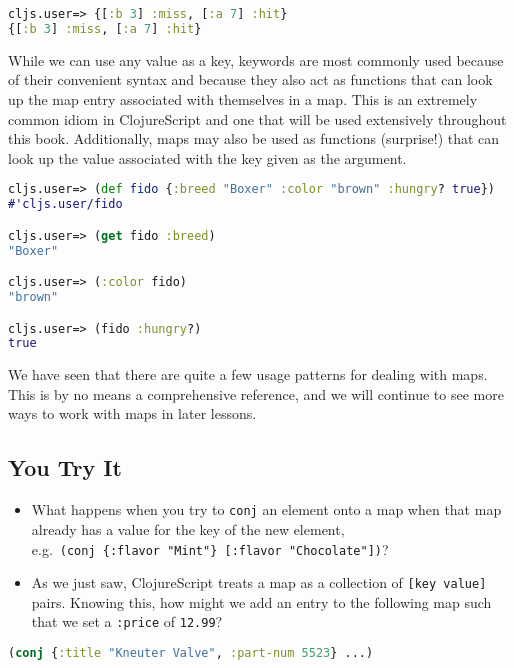 \documentclass[10pt,twoside,openright]{memoir}
\begin{document}
\begin{lstlisting}[language=Clojure]
cljs.user=> {[:b 3] :miss, [:a 7] :hit}
{[:b 3] :miss, [:a 7] :hit}
\end{lstlisting}

While we can use any value as a key, keywords are most commonly used
because of their convenient syntax and because they also act as
functions that can look up the map entry associated with themselves in a
map. This is an extremely common idiom in ClojureScript and one that
will be used extensively throughout this book. Additionally, maps may
also be used as functions (surprise!) that can look up the value
associated with the key given as the argument.

\begin{lstlisting}[language=Clojure]
cljs.user=> (def fido {:breed "Boxer" :color "brown" :hungry? true})
#'cljs.user/fido

cljs.user=> (get fido :breed)
"Boxer"

cljs.user=> (:color fido)
"brown"

cljs.user=> (fido :hungry?)
true
\end{lstlisting}

We have seen that there are quite a few usage patterns for dealing with
maps. This is by no means a comprehensive reference, and we will
continue to see more ways to work with maps in later lessons.

\subsection{You Try It}

\begin{itemize}
\tightlist
\item
  What happens when you try to \texttt{conj} an element onto a map when
  that map already has a value for the key of the new element,
  e.g.~\texttt{(conj\ \{:flavor\ "Mint"\}\ {[}:flavor\ "Chocolate"{]})}?
\item
  As we just saw, ClojureScript treats a map as a collection of
  \texttt{{[}key\ value{]}} pairs. Knowing this, how might we add an
  entry to the following map such that we set a \texttt{:price} of
  \texttt{12.99}?
\end{itemize}

\begin{lstlisting}[language=Clojure]
(conj {:title "Kneuter Valve", :part-num 5523} ...)
\end{lstlisting}
\end{document}
